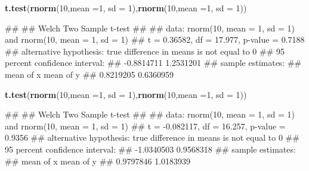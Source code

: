 \documentclass[
]{book}
\newenvironment{Shaded}{\begin{snugshade}}{\end{snugshade}}
\newcommand{\AttributeTok}[1]{\textcolor[rgb]{0.13,0.29,0.53}{#1}}
\newcommand{\DecValTok}[1]{\textcolor[rgb]{0.00,0.00,0.81}{#1}}
\newcommand{\FunctionTok}[1]{\textcolor[rgb]{0.13,0.29,0.53}{\textbf{#1}}}
\newcommand{\NormalTok}[1]{#1}
\begin{document}
\begin{Shaded}
\begin{Highlighting}[]
\FunctionTok{t.test}\NormalTok{(}\FunctionTok{rnorm}\NormalTok{(}\DecValTok{10}\NormalTok{,}\AttributeTok{mean =}\DecValTok{1}\NormalTok{, }\AttributeTok{sd =} \DecValTok{1}\NormalTok{),}\FunctionTok{rnorm}\NormalTok{(}\DecValTok{10}\NormalTok{,}\AttributeTok{mean =}\DecValTok{1}\NormalTok{, }\AttributeTok{sd =} \DecValTok{1}\NormalTok{))}
\end{Highlighting}
\end{Shaded}

\begin{Shaded}
\begin{Highlighting}[]
\NormalTok{\#\# }
\NormalTok{\#\#  Welch Two Sample t{-}test}
\NormalTok{\#\# }
\NormalTok{\#\# data:  rnorm(10, mean = 1, sd = 1) and rnorm(10, mean = 1, sd = 1)}
\NormalTok{\#\# t = 0.36582, df = 17.977, p{-}value = 0.7188}
\NormalTok{\#\# alternative hypothesis: true difference in means is not equal to 0}
\NormalTok{\#\# 95 percent confidence interval:}
\NormalTok{\#\#  {-}0.8814711  1.2531201}
\NormalTok{\#\# sample estimates:}
\NormalTok{\#\# mean of x mean of y }
\NormalTok{\#\# 0.8219205 0.6360959}
\end{Highlighting}
\end{Shaded}

\begin{Shaded}
\begin{Highlighting}[]
\FunctionTok{t.test}\NormalTok{(}\FunctionTok{rnorm}\NormalTok{(}\DecValTok{10}\NormalTok{,}\AttributeTok{mean =}\DecValTok{1}\NormalTok{, }\AttributeTok{sd =} \DecValTok{1}\NormalTok{),}\FunctionTok{rnorm}\NormalTok{(}\DecValTok{10}\NormalTok{,}\AttributeTok{mean =}\DecValTok{1}\NormalTok{, }\AttributeTok{sd =} \DecValTok{1}\NormalTok{))}
\end{Highlighting}
\end{Shaded}

\begin{Shaded}
\begin{Highlighting}[]
\NormalTok{\#\# }
\NormalTok{\#\#  Welch Two Sample t{-}test}
\NormalTok{\#\# }
\NormalTok{\#\# data:  rnorm(10, mean = 1, sd = 1) and rnorm(10, mean = 1, sd = 1)}
\NormalTok{\#\# t = {-}0.082117, df = 16.257, p{-}value = 0.9356}
\NormalTok{\#\# alternative hypothesis: true difference in means is not equal to 0}
\NormalTok{\#\# 95 percent confidence interval:}
\NormalTok{\#\#  {-}1.0340503  0.9568318}
\NormalTok{\#\# sample estimates:}
\NormalTok{\#\# mean of x mean of y }
\NormalTok{\#\# 0.9797846 1.0183939}
\end{Highlighting}
\end{Shaded}
\end{document}
